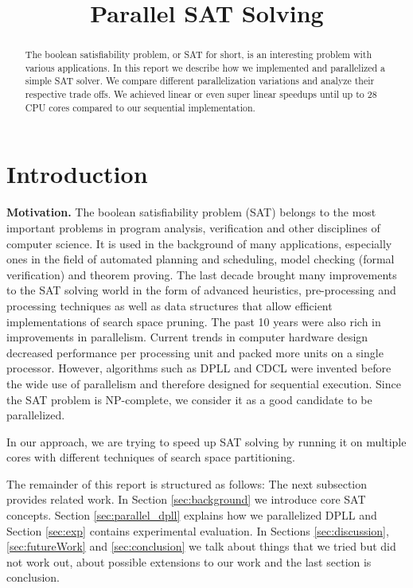 \documentclass[letterpaper]{article}
\title{Parallel SAT Solving}
\newcommand{\mypar}[1]{{\bf #1.}}
\begin{document}
%
\maketitle
%

\begin{abstract}
The boolean satisfiability problem, or SAT for short, is an interesting problem with various applications.
In this report we describe how we implemented and parallelized a simple SAT solver.
We compare different parallelization variations and analyze their respective trade offs.
We achieved linear or even super linear speedups until up to 28 CPU cores compared to our sequential implementation.
\end{abstract}

\section{Introduction}\label{sec:intro}

\mypar{Motivation}
The boolean satisfiability problem (SAT) belongs to the most important problems in program analysis, verification and other disciplines of computer science.
It is used in the background of many applications, especially ones in the field of automated planning and scheduling, model checking (formal verification) and theorem proving.
The last decade brought many improvements to the SAT solving world in the form of advanced heuristics, pre-processing and processing techniques as well as data structures that allow efficient implementations of search space pruning.
The past 10 years were also rich in improvements in parallelism.
Current trends in computer hardware design decreased performance per processing unit and packed more units on a single processor.
However, algorithms such as DPLL and CDCL were invented before the wide use of parallelism and therefore designed for sequential execution.
Since the SAT problem is NP-complete, we consider it as a good candidate to be parallelized.

In our approach, we are trying to speed up SAT solving by running it on multiple cores with different techniques of search space partitioning.

The remainder of this report is structured as follows:
The next subsection provides related work.
In Section \ref{sec:background} we introduce core SAT concepts.
Section \ref{sec:parallel_dpll} explains how we parallelized DPLL and Section \ref{sec:exp} contains experimental evaluation.
In Sections \ref{sec:discussion}, \ref{sec:futureWork} and \ref{sec:conclusion} we talk about things that we tried but did not work out, about possible extensions to our work and the last section is conclusion.
\end{document}
